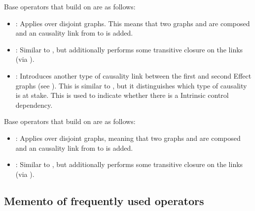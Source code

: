 Base operators that build on  are as follows:
\begin{itemize}
\item \source{=*$=}: Applies  over disjoint graphs. This
means that two graphs  and  are composed and an
 causality link from  to  is added.

\item \source{=$$=}: Similar to \source{=*$=}, but additionally performs some
transitive closure on the  links (via ).

\item {}: Introduces another type of causality link between
the first and second Effect graphs (see ). This
is similar to , but it distinguishes which type of causality
is at stake. This is used to indicate whether there is a Intrinsic control
dependency.
\end{itemize}


Base operators that build on  are as follows:
\begin{itemize}
\item \source{=**=}: Applies  over disjoint graphs,
meaning that two graphs  and  are composed and an
 causality link from  to  is
added.

\item \source{=*$$=}: Similar to \source{=**=}, but additionally performs some
transitive closure on the  links (via
).
\end{itemize}

\subsection{Memento of frequently used operators}

